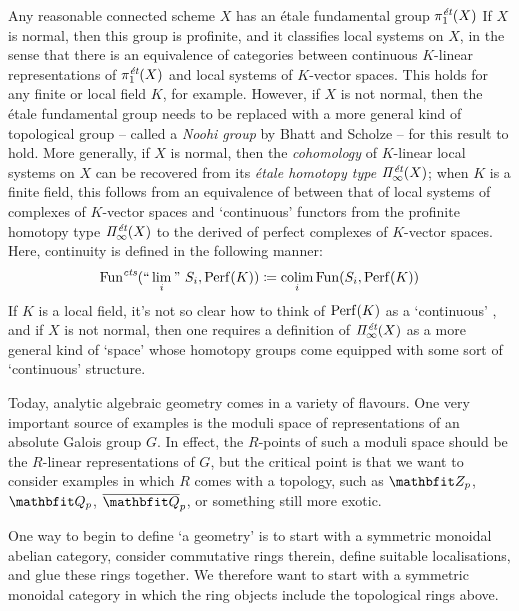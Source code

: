 \begin{exm*}
	Any reasonable connected scheme $ X $ has an étale fundamental group $ \pi_1^{\et}(X) $ 
	If $ X $ is normal, then this group is profinite, and it classifies local systems on $ X $, in the sense that there is an equivalence of categories between continuous $K$-linear representations of $ \pi_1^{\et}(X) $ and local systems of $ K $-vector spaces.
	This holds for any finite or local field $ K $, for example.
	However, if $ X $ is not normal, then the étale fundamental group needs to be replaced with a more general kind of topological group -- called a \emph{Noohi group} by Bhatt and Scholze -- for this result to hold.
	More generally, if $ X $ is normal, then the \emph{cohomology} of $ K $-linear local systems on $ X $ can be recovered from its \emph{étale homotopy type} $ \Pi_{\infty}^{\et}(X) $;
	when $ K $ is a finite field, this follows from an equivalence of \categories between that of local systems of complexes of $ K $-vector spaces and `continuous' functors from the profinite homotopy type $ \Pi_{\infty}^{\et}(X) $ to the derived \category of perfect complexes of $ K $-vector spaces.
	Here, continuity is defined in the following manner:
	\[
		\Functs( \text{``}\lim_i\text{''}\ S_i, \Dperf(K)) \coloneq \colim_i \Fun ( S_i, \Dperf(K))
	\]
	If $ K $ is a local field, it's not so clear how to think of $ \Dperf(K) $ as a `continuous' \category, and if $ X $ is not normal, then one requires a definition of $ \Pi_{\infty}^{\et}(X) $ as a more general kind of `space' whose homotopy groups come equipped with some sort of `continuous' structure.
\end{exm*}

\begin{exm*}
	Today, analytic algebraic geometry comes in a variety of flavours.
	One very important source of examples is the moduli space of representations of an absolute Galois group $ G $.
	In effect, the $ R $-points of such a moduli space should be the $ R $-linear representations of $ G $, but the critical point is that we want to consider examples in which $ R $ comes with a topology, such as $ \ZZ_p $, $ \QQ_p $, $ \overline{\QQ}_p $, or something still more exotic.

	One way to begin to define `a geometry' is to start with a symmetric monoidal abelian category, consider commutative rings therein, define suitable localisations, and glue these rings together.
	We therefore want to start with a symmetric monoidal category in which the ring objects include the topological rings above.
\end{exm*}


